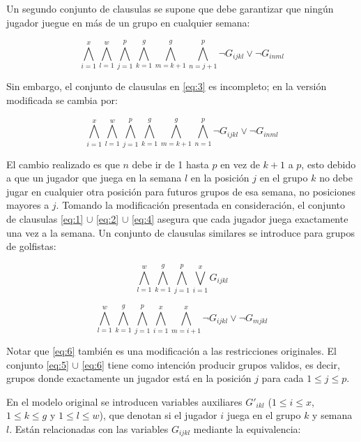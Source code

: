 \documentclass[letter, 10pt]{article}
\begin{document}
Un segundo conjunto de clausulas se supone que debe garantizar que ningún jugador juegue en más de un grupo en cualquier semana:

\begin{equation}
    \bigwedge_{i=1}^{x} \bigwedge_{l=1}^{w} \bigwedge_{j=1}^{p} \bigwedge_{k=1}^{g} \bigwedge_{m=k+1}^{g} \bigwedge_{n=j+1}^p \neg G_{ijkl} \vee \neg G_{inml}
    \label{eq:3}
\end{equation}

Sin embargo, el conjunto de clausulas en \ref{eq:3} es incompleto; en la versión modificada se cambia por:

\begin{equation}
    \bigwedge_{i=1}^{x} \bigwedge_{l=1}^{w} \bigwedge_{j=1}^{p} \bigwedge_{k=1}^{g} \bigwedge_{m=k+1}^{g} \bigwedge_{n=1}^p \neg G_{ijkl} \vee \neg G_{inml}
    \label{eq:4}
\end{equation}

El cambio realizado es que $n$ debe ir de 1 hasta $p$ en vez de $k+1$ a $p$, esto debido a que un jugador que juega en la semana $l$ en la posición $j$ en el grupo $k$ no debe jugar en cualquier otra posición para futuros grupos de esa semana, no posiciones mayores a $j$. Tomando la modificación presentada en consideración, el conjunto de clausulas \ref{eq:1} $\cup$ \ref{eq:2} $\cup$ \ref{eq:4} asegura que cada jugador juega exactamente una vez a la semana. Un conjunto de clausulas similares se introduce para grupos de golfistas:

\begin{equation}
    \bigwedge_{l=1}^{w} \bigwedge_{k=1}^{g} \bigwedge_{j=1}^{p} \bigvee_{i=1}^{x} 
    G_{ijkl}
    \label{eq:5}
\end{equation}

\begin{equation}
    \bigwedge_{l=1}^{w} \bigwedge_{k=1}^{g} \bigwedge_{j=1}^{p} \bigwedge_{i=1}^{x}
    \bigwedge_{m=i+1}^x
    \neg G_{ijkl} \vee \neg G_{mjkl}
    \label{eq:6}
\end{equation}

Notar que \ref{eq:6} también es una modificación a las restricciones originales. El conjunto \ref{eq:5} $\cup$ \ref{eq:6} tiene como intención producir grupos validos, es decir, grupos donde exactamente un jugador está en la posición $j$ para cada $1\leq j \leq p$.

En el modelo original se introducen variables auxiliares $G'_{ikl}$ ($1\leq i \leq x$, $1\leq k \leq g$ y $1\leq l \leq w$), que denotan si el jugador $i$ juega en el grupo $k$ y semana $l$. Están relacionadas con las variables $G_{ijkl}$ mediante la equivalencia:
\end{document}
